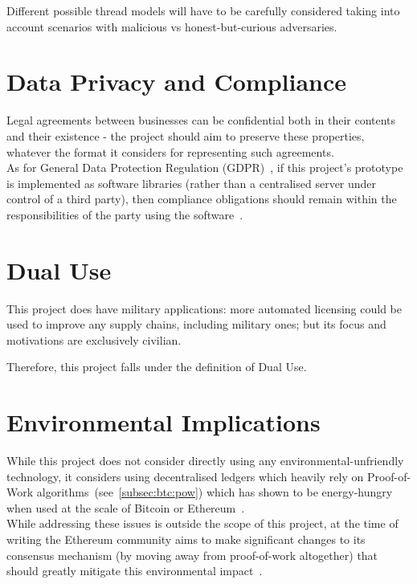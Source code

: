 Different possible thread models will have to be carefully considered taking into account scenarios
with malicious vs honest-but-curious adversaries.


\section{Data Privacy and Compliance}\label{sec:data-privacy-compliance}

Legal agreements between businesses can be confidential both in their contents and their existence -
the project should aim to preserve these properties, whatever the format it considers for
representing such agreements.\\

As for General Data Protection Regulation (GDPR)~\cite{gdprInfo}, if this project's prototype is
implemented as software libraries (rather than a centralised server under control of a third party),
then compliance obligations should remain within the responsibilities of the party using the
software~\citeTODO.

\section{Dual Use}\label{sec:dual-use}

This project does have military applications: more automated licensing could be used to improve
any supply chains, including military ones;
but its focus and motivations are exclusively civilian.

Therefore, this project falls under the definition of Dual Use.

\section{Environmental Implications}\label{sec:environmental-implications}

While this project does not consider directly using any environmental-unfriendly technology, it
considers using decentralised ledgers which heavily rely on Proof-of-Work
algorithms~(see~\ref{subsec:btc:pow}) which has shown to be energy-hungry when used at the scale of
Bitcoin or Ethereum~\cite{GOODKIND2020101281}.\\

While addressing these issues is outside the scope of this project, at the time of writing the
Ethereum community aims to make significant changes to its consensus mechanism (by moving away from
proof-of-work altogether) that should greatly mitigate this environmental impact~\cite{eth2Vision}.

